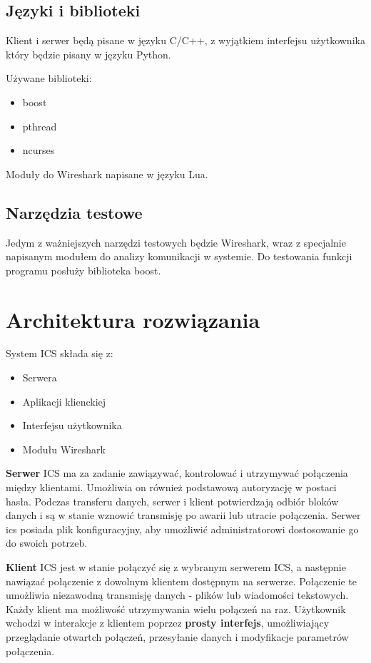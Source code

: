 \documentclass{article}
\begin{document}
\subsection{Języki i biblioteki}

Klient i serwer będą pisane w języku C/C++, z wyjątkiem interfejsu użytkownika który będzie pisany w języku Python.

Używane biblioteki:
\begin{itemize}

\item boost
\item pthread
\item ncurses
  
\end{itemize}


Moduły do Wireshark napisane w języku Lua.

\subsection{Narzędzia testowe}

Jedym z ważniejszych narzędzi testowych będzie Wireshark, wraz z specjalnie napisanym modułem do analizy komunikacji w systemie.
 Do testowania funkcji programu posłuży biblioteka boost.

\section{Architektura rozwiązania\label{arch}}

System ICS składa się z:
\begin{itemize}
\item Serwera
\item Aplikacji klienckiej
\item Interfejsu użytkownika
\item Modułu Wireshark
\end{itemize}

\textbf{Serwer} ICS ma za zadanie zawiązywać, kontrolować i utrzymywać połączenia między klientami. Umożliwia on również podstawową autoryzację w postaci hasła. Podczas transferu danych, serwer i klient potwierdzają odbiór bloków danych i są w stanie wznowić transmisję po awarii lub utracie połączenia. Serwer ics posiada plik konfiguracyjny, aby umożliwić administratorowi dostosowanie go do swoich potrzeb.


\textbf{Klient} ICS jest w stanie połączyć się z wybranym serwerem ICS, a następnie nawiązać połączenie z dowolnym klientem dostępnym na serwerze. Połączenie te umożliwia niezawodną transmisję danych -  plików lub wiadomości tekstowych. Każdy klient ma możliwość utrzymywania wielu połączeń na raz. Użytkownik wchodzi w interakcje z klientem poprzez \textbf{prosty interfejs}, umożliwiający przeglądanie otwartch połączeń, przesyłanie danych i modyfikacje parametrów połączenia.
\end{document}
